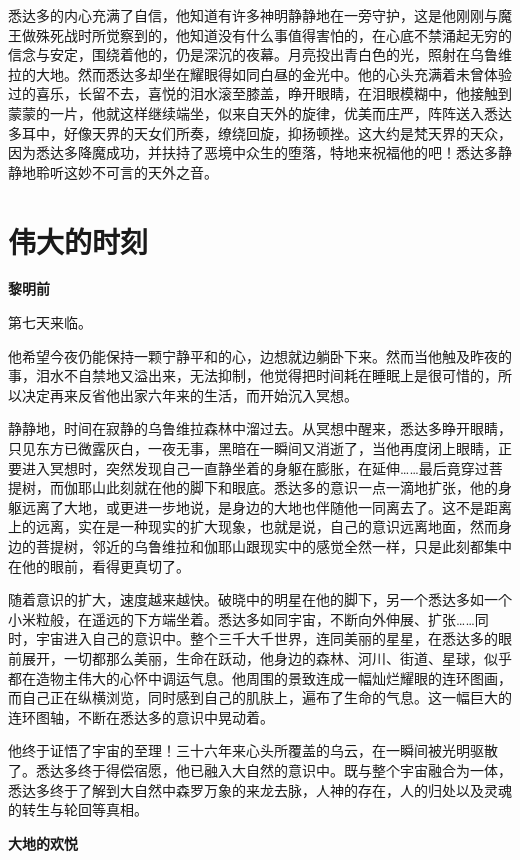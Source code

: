 \documentclass[twoside,openany]{book}
\newcommand{\mt}[1]{\textbullet \textbf{#1}}
\begin{document}
悉达多的内心充满了自信，他知道有许多神明静静地在一旁守护，这是他刚刚与魔王做殊死战时所觉察到的，他知道没有什么事值得害怕的，在心底不禁涌起无穷的信念与安定，围绕着他的，仍是深沉的夜幕。月亮投出青白色的光，照射在乌鲁维拉的大地。然而悉达多却坐在耀眼得如同白昼的金光中。他的心头充满着未曾体验过的喜乐，长留不去，喜悦的泪水滚至膝盖，睁开眼睛，在泪眼模糊中，他接触到蒙蒙的一片，他就这样继续端坐，似来自天外的旋律，优美而庄严，阵阵送入悉达多耳中，好像天界的天女们所奏，缭绕回旋，抑扬顿挫。这大约是梵天界的天众，因为悉达多降魔成功，并扶持了恶境中众生的堕落，特地来祝福他的吧！悉达多静静地聆听这妙不可言的天外之音。

\section{伟大的时刻}\label{sec1.16}

\mt{黎明前}

第七天来临。

他希望今夜仍能保持一颗宁静平和的心，边想就边躺卧下来。然而当他触及昨夜的事，泪水不自禁地又溢出来，无法抑制，他觉得把时间耗在睡眠上是很可惜的，所以决定再来反省他出家六年来的生活，而开始沉入冥想。

静静地，时间在寂静的乌鲁维拉森林中溜过去。从冥想中醒来，悉达多睁开眼睛，只见东方已微露灰白，一夜无事，黑暗在一瞬间又消逝了，当他再度闭上眼睛，正要进入冥想时，突然发现自己一直静坐着的身躯在膨胀，在延伸……最后竟穿过菩提树，而伽耶山此刻就在他的脚下和眼底。悉达多的意识一点一滴地扩张，他的身躯远离了大地，或更进一步地说，是身边的大地也伴随他一同离去了。这不是距离上的远离，实在是一种现实的扩大现象，也就是说，自己的意识远离地面，然而身边的菩提树，邻近的乌鲁维拉和伽耶山跟现实中的感觉全然一样，只是此刻都集中在他的眼前，看得更真切了。

随着意识的扩大，速度越来越快。破晓中的明星在他的脚下，另一个悉达多如一个小米粒般，在遥远的下方端坐着。悉达多如同宇宙，不断向外伸展、扩张……同时，宇宙进入自己的意识中。整个三千大千世界，连同美丽的星星，在悉达多的眼前展开，一切都那么美丽，生命在跃动，他身边的森林、河川、街道、星球，似乎都在造物主伟大的心怀中调运气息。他周围的景致连成一幅灿烂耀眼的连环图画，而自己正在纵横浏览，同时感到自己的肌肤上，遍布了生命的气息。这一幅巨大的连环图轴，不断在悉达多的意识中晃动着。

他终于证悟了宇宙的至理！三十六年来心头所覆盖的乌云，在一瞬间被光明驱散了。悉达多终于得偿宿愿，他已融入大自然的意识中。既与整个宇宙融合为一体，悉达多终于了解到大自然中森罗万象的来龙去脉，人神的存在，人的归处以及灵魂的转生与轮回等真相。

\mt{大地的欢悦}
\end{document}
